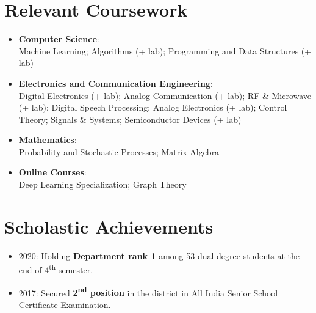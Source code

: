 \documentclass[a4,10pt]{article}
\newcommand{\resumeItem}[2]{
  \item\small{
    \textbf{#1}{: #2 \vspace{-2pt}}
  }
}
\newcommand{\resumeSubItem}[2]{\resumeItem{#1}{#2}\vspace{-4pt}}
\newcommand{\resumeSubHeadingListStart}{\begin{itemize}[leftmargin=*]}
\newcommand{\resumeSubHeadingListEnd}{\end{itemize}}
\begin{document}
 \section{Relevant Coursework}
  \resumeSubHeadingListStart
    \resumeSubItem{Computer Science}
      {\\Machine Learning; Algorithms (+ lab); Programming and Data Structures (+ lab)}
    \resumeSubItem{Electronics and Communication Engineering}
      {\\Digital Electronics (+ lab); Analog Communication (+ lab); RF \& Microwave (+ lab); Digital Speech Processing; Analog Electronics (+ lab); Control Theory; Signals \& Systems; Semiconductor Devices (+ lab)}
    \resumeSubItem{Mathematics}
      {\\Probability and Stochastic Processes; Matrix Algebra}
    \resumeSubItem{Online Courses}
      {\\Deep Learning Specialization; Graph Theory}
  \resumeSubHeadingListEnd

\section{Scholastic Achievements}
  \resumeSubHeadingListStart
      \itemsep-0.5em
      \item{2020: Holding \textbf{Department rank 1} among 53 dual degree students at the end of 4\textsuperscript{th} semester.}
      \item{2017: Secured \textbf{2\textsuperscript{nd} position} in the district in All India Senior School Certificate Examination.}
      
  \resumeSubHeadingListEnd
\end{document}
